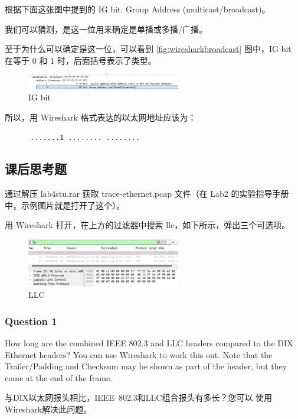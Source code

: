 \documentclass[14pt,a4paper,UTF8,twoside]{article}
\begin{document}
根据下面这张图中提到的 IG bit: Group Address (multicast/broadcast)。

我们可以猜测，是这一位用来确定是单播或多播/广播。

至于为什么可以确定是这一位，可以看到 \ref{fig:wiresharkbroadcast} 图中，IG bit 在等于 0 和 1 时，后面括号表示了类型。

\begin{figure}[H]
  \centering
  \includegraphics[width=0.6\textwidth]{lab2/brostcast.png}
  \caption{IG bit}
\end{figure}

所以，用 Wireshark 格式表达的以太网地址应该为：
\begin{lstlisting}
      .......1 ........ ........
\end{lstlisting}

\subsection{课后思考题}

通过解压 lab4stu.rar 获取 trace-ethernet.pcap 文件（在 Lab2 的实验指导手册中，示例图片就是打开了这个）。

用 Wireshark 打开，在上方的过滤器中搜索 llc，如下所示，弹出三个可选项。

\begin{figure}[H]
  \centering
  \includegraphics[width=0.6\textwidth]{lab2/llc.png}
  \caption{LLC}
\end{figure}



\subsubsection{Question 1}
How long are the combined IEEE 802.3 and LLC headers compared to the DIX Ethernet headers? You can use Wireshark to work this out. Note that the Trailer/Padding and Checksum may be shown as part of the header, but they come at the end of the frame.

与DIX以太网报头相比，IEEE 802.3和LLC组合报头有多长？您可以
使用Wireshark解决此问题。
\end{document}
